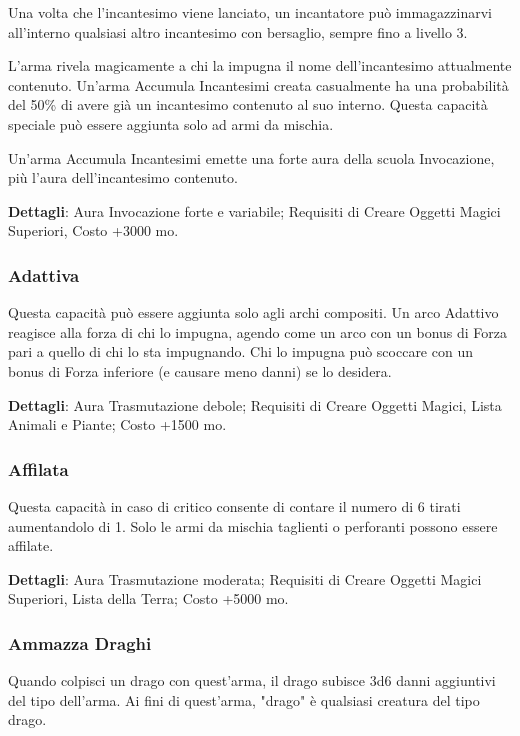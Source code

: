 \begin{multicols}{2}
Una volta che l'incantesimo viene lanciato, un incantatore può immagazzinarvi all'interno qualsiasi altro incantesimo con bersaglio, sempre fino a livello 3.

L'arma rivela magicamente a chi la impugna il nome dell'incantesimo attualmente contenuto. Un'arma Accumula Incantesimi creata casualmente ha una probabilità del 50\% di avere già un incantesimo contenuto al suo interno. Questa capacità speciale può essere aggiunta solo ad armi da mischia.

Un'arma Accumula Incantesimi emette una forte aura della scuola Invocazione, più l'aura dell'incantesimo contenuto.

\textbf{Dettagli}: Aura Invocazione forte e variabile; Requisiti di Creare Oggetti Magici Superiori, Costo +3000 mo.

\subsubsection*{Adattiva}

Questa capacità può essere aggiunta solo agli archi compositi. Un arco Adattivo reagisce alla forza di chi lo impugna, agendo come un arco con un bonus di Forza pari a quello di chi lo sta impugnando. Chi lo impugna può scoccare con un bonus di Forza inferiore (e causare meno danni) se lo desidera.

\textbf{Dettagli}: Aura Trasmutazione debole; Requisiti di Creare Oggetti Magici, Lista Animali e Piante; Costo +1500 mo.

\subsubsection*{Affilata}

Questa capacità in caso di critico consente di contare il numero di 6 tirati aumentandolo di 1. Solo le armi da mischia taglienti o perforanti possono essere affilate.

\textbf{Dettagli}: Aura Trasmutazione moderata; Requisiti di Creare Oggetti Magici Superiori, Lista della Terra; Costo +5000 mo.

\subsubsection*{Ammazza Draghi}

Quando colpisci un drago con quest'arma, il drago subisce 3d6 danni aggiuntivi del tipo dell'arma. Ai fini di quest'arma, "drago" è qualsiasi creatura del tipo drago.


\end{multicols}

